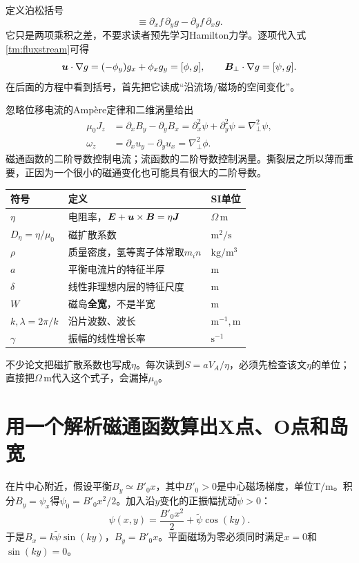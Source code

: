 定义泊松括号
\begin{equation}
 [f,g]\equiv\partial_x f\,\partial_y g-\partial_y f\,\partial_x g.
 \label{tm:bracket}
\end{equation}
它只是两项乘积之差，不要求读者预先学习Hamilton力学。逐项代入式\eqref{tm:fluxstream}可得
\begin{equation}
 \bm{u}\cdot\nabla g=(-\phi_y)g_x+\phi_xg_y=[\phi,g],
 \qquad \bm{B}_\perp\cdot\nabla g=[\psi,g].
\end{equation}
在后面的方程中看到括号，首先把它读成“沿流场/磁场的空间变化”。

忽略位移电流的Amp\`ere定律和二维涡量给出
\begin{align}
 \mu_0J_z&=\partial_xB_y-\partial_yB_x
 =\partial_x^2\psi+\partial_y^2\psi=\nabla_\perp^2\psi,\label{tm:current}\\
 \omega_z&=\partial_xu_y-\partial_yu_x=\nabla_\perp^2\phi.
 \label{tm:vorticity}
\end{align}
磁通函数的二阶导数控制电流；流函数的二阶导数控制涡量。撕裂层之所以薄而重要，正因为一个很小的磁通变化也可能具有很大的二阶导数。

\begin{center}
\begin{tabular}{lll}\toprule
符号&定义&SI单位\\\midrule
$\eta$&电阻率，$\bm{E}+\bm{u}\times\bm{B}=\eta\bm{J}$&$\Omega\,\mathrm m$\\
$D_\eta=\eta/\mu_0$&磁扩散系数&$\mathrm{m^2/s}$\\
$\rho$&质量密度，氢等离子体常取$m_in$&$\mathrm{kg/m^3}$\\
$a$&平衡电流片的特征半厚&$\mathrm m$\\
$\delta$&线性非理想内层的特征尺度&$\mathrm m$\\
$W$&磁岛\textbf{全宽}，不是半宽&$\mathrm m$\\
$k,\lambda=2\pi/k$&沿片波数、波长&$\mathrm{m^{-1}},\mathrm m$\\
$\gamma$&振幅的线性增长率&$\mathrm{s^{-1}}$\\\bottomrule
\end{tabular}
\end{center}
不少论文把磁扩散系数也写成$\eta$。每次读到$S=aV_A/\eta$，必须先检查该文$\eta$的单位；直接把$\Omega\,\mathrm m$代入这个式子，会漏掉$\mu_0$。

\section{用一个解析磁通函数算出X点、O点和岛宽}
在片中心附近，假设平衡$B_y\simeq B'_0x$，其中$B'_0>0$是中心磁场梯度，单位$\mathrm{T/m}$。积分$B_y=\psi_x$得$\psi_0=B'_0x^2/2$。加入沿$y$变化的正振幅扰动$\widetilde\psi>0$：
\begin{equation}
 \psi(x,y)=\frac{B'_0x^2}{2}+\widetilde\psi\cos(ky).
 \label{tm:islandpsi}
\end{equation}
于是$B_x=k\widetilde\psi\sin(ky)$，$B_y=B'_0x$。平面磁场为零必须同时满足$x=0$和$\sin(ky)=0$。

